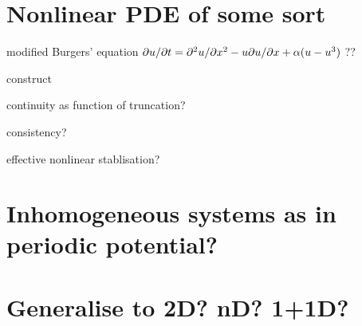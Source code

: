 \documentclass[12pt,a5paper]{article}
\begin{document}
\section{Nonlinear PDE of some sort}

modified Burgers' equation \(\D tu=\DD xu-u\D xu+\alpha(u-u^3)\) ??

construct

continuity as function of truncation?

consistency?

effective nonlinear stablisation?


\section{Inhomogeneous systems as in periodic potential?}


\section{Generalise to 2D? nD? 1+1D?}


\clearpage
\appendix
\end{document}
